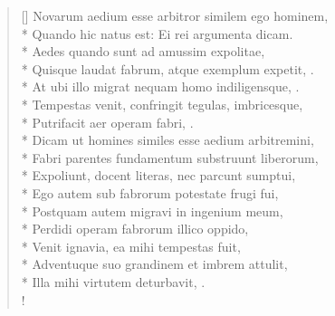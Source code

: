 {{\begin{latin}
\begin{verse}[\versewidth]
Novarum aedium esse arbitror similem ego hominem,\\*
Quando hic natus est: Ei rei argumenta dicam.\\*
Aedes quando sunt ad amussim expolitae,\\*
Quisque laudat fabrum, atque exemplum expetit, \etc{}.\\*
At ubi illo migrat nequam homo indiligensque, \etc{}.\\*
Tempestas venit, confringit tegulas, imbricesque,\\*
Putrifacit aer operam fabri, \etc{}.\\*
Dicam ut homines similes esse aedium arbitremini,\\*
Fabri parentes fundamentum substruunt liberorum,\\*
Expoliunt, docent literas, nec parcunt sumptui,\\*
Ego autem sub fabrorum potestate frugi fui,\\*
Postquam autem migravi in ingenium meum,\\*
Perdidi operam fabrorum illico oppido,\\*
Venit ignavia, ea mihi tempestas fuit,\\*
Adventuque suo grandinem et imbrem attulit,\\*
Illa mihi virtutem deturbavit, \etc{}.\\!
\end{verse}
\end{latin}

}}
